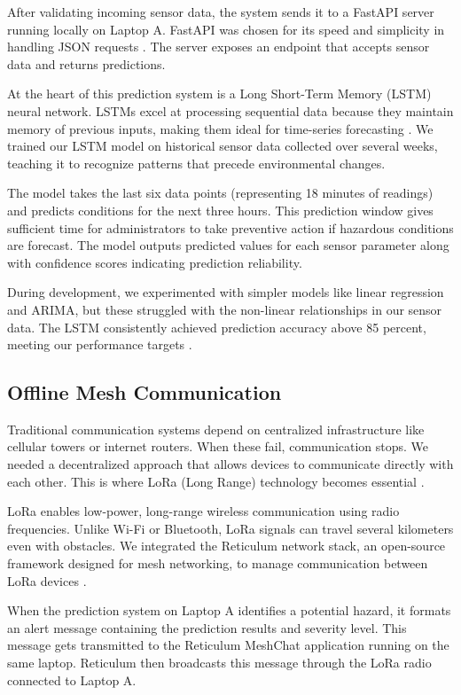 After validating incoming sensor data, the system sends it to a FastAPI server running locally on Laptop A. FastAPI was chosen for its speed and simplicity in handling JSON requests \cite{ramirez2020fastapi}. The server exposes an endpoint that accepts sensor data and returns predictions.

At the heart of this prediction system is a Long Short-Term Memory (LSTM) neural network. LSTMs excel at processing sequential data because they maintain memory of previous inputs, making them ideal for time-series forecasting \cite{hochreiter1997long}. We trained our LSTM model on historical sensor data collected over several weeks, teaching it to recognize patterns that precede environmental changes.

The model takes the last six data points (representing 18 minutes of readings) and predicts conditions for the next three hours. This prediction window gives sufficient time for administrators to take preventive action if hazardous conditions are forecast. The model outputs predicted values for each sensor parameter along with confidence scores indicating prediction reliability.

During development, we experimented with simpler models like linear regression and ARIMA, but these struggled with the non-linear relationships in our sensor data. The LSTM consistently achieved prediction accuracy above 85 percent, meeting our performance targets \cite{gers2002learning}.

\subsection{Offline Mesh Communication}

Traditional communication systems depend on centralized infrastructure like cellular towers or internet routers. When these fail, communication stops. We needed a decentralized approach that allows devices to communicate directly with each other. This is where LoRa (Long Range) technology becomes essential \cite{adelantado2017understanding}.

LoRa enables low-power, long-range wireless communication using radio frequencies. Unlike Wi-Fi or Bluetooth, LoRa signals can travel several kilometers even with obstacles. We integrated the Reticulum network stack, an open-source framework designed for mesh networking, to manage communication between LoRa devices \cite{reticulum2023documentation}.

When the prediction system on Laptop A identifies a potential hazard, it formats an alert message containing the prediction results and severity level. This message gets transmitted to the Reticulum MeshChat application running on the same laptop. Reticulum then broadcasts this message through the LoRa radio connected to Laptop A.

